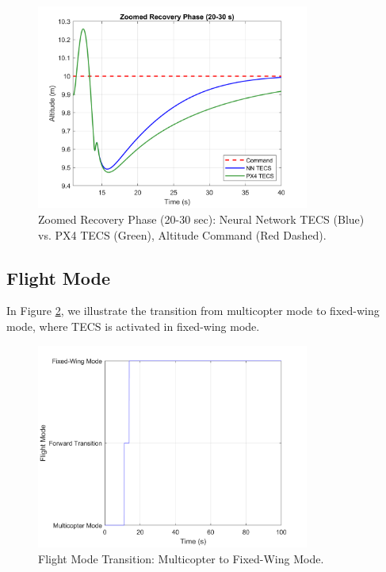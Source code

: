 \documentclass[journal,article,submit,pdftex,moreauthors]{Definitions/mdpi}
\begin{document}
\begin{figure}[H]
    \centering
    \includegraphics[width=0.8\textwidth]{zoomed_altitude_plot.png}
    \caption{Zoomed Recovery Phase (20-30 sec): Neural Network TECS (Blue) vs. PX4 TECS (Green), Altitude Command (Red Dashed).}
    \label{fig:zoomed_altitude}
\end{figure}

\subsection{Flight Mode}
In Figure \ref{fig:flight_state}, we illustrate the transition from multicopter mode to fixed-wing mode, where TECS is activated in fixed-wing mode.

\begin{figure}[H]
    \centering
    \includegraphics[width=0.8\textwidth]{flight_state_plot.png}
    \caption{Flight Mode Transition: Multicopter to Fixed-Wing Mode.}
    \label{fig:flight_state}
\end{figure}
\end{document}
